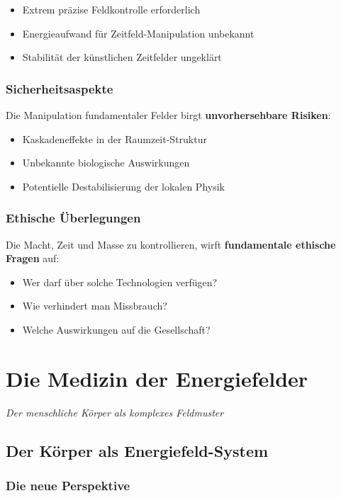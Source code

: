 \documentclass[12pt,a4paper]{report}
\begin{document}
	\begin{itemize}
		\item Extrem präzise Feldkontrolle erforderlich
		\item Energieaufwand für Zeitfeld-Manipulation unbekannt
		\item Stabilität der künstlichen Zeitfelder ungeklärt
	\end{itemize}
	
	\subsection{Sicherheitsaspekte}
	
	Die Manipulation fundamentaler Felder birgt \textbf{unvorhersehbare Risiken}:
	
	\begin{itemize}
		\item Kaskadeneffekte in der Raumzeit-Struktur
		\item Unbekannte biologische Auswirkungen
		\item Potentielle Destabilisierung der lokalen Physik
	\end{itemize}
	
	\subsection{Ethische Überlegungen}
	
	Die Macht, Zeit und Masse zu kontrollieren, wirft \textbf{fundamentale ethische Fragen} auf:
	
	\begin{itemize}
		\item Wer darf über solche Technologien verfügen?
		\item Wie verhindert man Missbrauch?
		\item Welche Auswirkungen auf die Gesellschaft?
	\end{itemize}
	
	\chapter{Die Medizin der Energiefelder}
	\textit{Der menschliche Körper als komplexes Feldmuster}
	
	\section{Der Körper als Energiefeld-System}
	
	\subsection{Die neue Perspektive}
	
\end{document}
